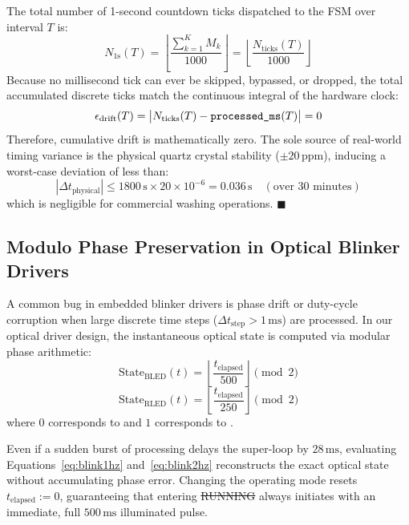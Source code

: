 The total number of 1-second countdown ticks dispatched to the FSM over interval $T$ is:
\begin{equation}
  N_{1\text{s}}(T) = \left\lfloor \frac{\sum_{k=1}^K M_k}{1000} \right\rfloor = \left\lfloor \frac{N_{\text{ticks}}(T)}{1000} \right\rfloor
\end{equation}
Because no millisecond tick can ever be skipped, bypassed, or dropped, the total accumulated discrete ticks
match the continuous integral of the hardware clock:
\begin{equation}
  \epsilon_{\text{drift}}(T) = \big| N_{\text{ticks}}(T) - \code{processed_ms}(T) \big| = 0
\end{equation}
Therefore, cumulative drift is mathematically zero. The sole source of real-world timing variance is the
physical quartz crystal stability ($\pm 20\,\text{ppm}$), inducing a worst-case deviation of less than:
\begin{equation}
  |\Delta t_{\text{physical}}| \le 1800\,\text{s} \times 20 \times 10^{-6} = 0.036\,\text{s} \quad (\text{over 30 minutes})
\end{equation}
which is negligible for commercial washing operations. \hfill $\blacksquare$

\subsection{Modulo Phase Preservation in Optical Blinker Drivers}

A common bug in embedded blinker drivers is phase drift or duty-cycle corruption when large discrete
time steps ($\Delta t_{\text{step}} > 1\,\text{ms}$) are processed. In our optical driver design,
the instantaneous optical state is computed via modular phase arithmetic:
\begin{equation}
  \text{State}_{\text{BLED}}(t) = \left\lfloor \frac{t_{\text{elapsed}}}{500} \right\rfloor \pmod 2
  \label{eq:blink1hz}
\end{equation}
\begin{equation}
  \text{State}_{\text{RLED}}(t) = \left\lfloor \frac{t_{\text{elapsed}}}{250} \right\rfloor \pmod 2
  \label{eq:blink2hz}
\end{equation}
where $0$ corresponds to  and $1$ corresponds to .

Even if a sudden burst of processing delays the super-loop by $28\,\text{ms}$, evaluating
Equations~\eqref{eq:blink1hz} and~\eqref{eq:blink2hz} reconstructs the exact optical state without
accumulating phase error. Changing the operating mode resets $t_{\text{elapsed}} := 0$, guaranteeing
that entering \st{RUNNING} always initiates with an immediate, full $500\,\text{ms}$ illuminated pulse.


